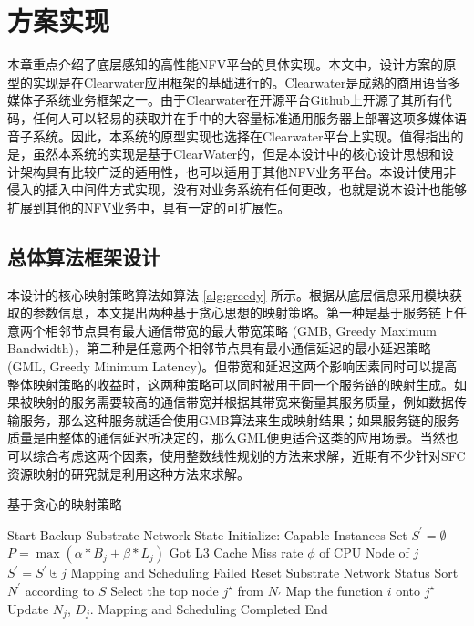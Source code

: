 \chapter{方案实现}
\label{chapter:implement}
本章重点介绍了底层感知的高性能NFV平台的具体实现。本文中，设计方案的原型的实现是在Clearwater应用框架的基础进行的。Clearwater是成熟的商用语音多媒体子系统业务框架之一。由于Clearwater在开源平台Github上开源了其所有代码，任何人可以轻易的获取并在手中的大容量标准通用服务器上部署这项多媒体语音子系统。因此，本系统的原型实现也选择在Clearwater平台上实现。值得指出的是，虽然本系统的实现是基于ClearWater的，但是本设计中的核心设计思想和设计架构具有比较广泛的适用性，也可以适用于其他NFV业务平台。本设计使用非侵入的插入中间件方式实现，没有对业务系统有任何更改，也就是说本设计也能够扩展到其他的NFV业务中，具有一定的可扩展性。
\section{总体算法框架设计}
本设计的核心映射策略算法如算法 \ref{alg:greedy} 所示。根据从底层信息采用模块获取的参数信息，本文提出两种基于贪心思想的映射策略。第一种是基于服务链上任意两个相邻节点具有最大通信带宽的最大带宽策略 (GMB, Greedy Maximum Bandwidth)，第二种是任意两个相邻节点具有最小通信延迟的最小延迟策略 (GML, Greedy Minimum Latency)。但带宽和延迟这两个影响因素同时可以提高整体映射策略的收益时，这两种策略可以同时被用于同一个服务链的映射生成。如果被映射的服务需要较高的通信带宽并根据其带宽来衡量其服务质量，例如数据传输服务，那么这种服务就适合使用GMB算法来生成映射结果；如果服务链的服务质量是由整体的通信延迟所决定的，那么GML便更适合这类的应用场景。当然也可以综合考虑这两个因素，使用整数线性规划的方法来求解，近期有不少针对SFC资源映射的研究就是利用这种方法来求解。
\begin{algorithm} 
	\caption{基于贪心的映射策略}  
	\label{alg:greedy}  
	\begin{algorithmic} [1]
		\State Start
		\State Backup Substrate Network State
		\State Initialize: Capable Instances Set $S^{\prime} = \emptyset$
		\State	$P = \max(\alpha*B_{j} + \beta*L_{j})$
		\State Got L3 Cache Miss rate $\phi$ of CPU Node of $j$
		\State $S^{\prime} = S^{\prime}\uplus j $
		\EndIf			
		\EndFor					
		\State Mapping and Scheduling Failed
		\State Reset Substrate Network Status
		\Return
		\EndIf
		\State Sort $N^{\prime}$ according to $S$	
		\State Select the top node $j^{\star}$ from $N_{\prime}$
		\State Map the function $i$ onto  $j^{\star}$
		\State Update $N_{j}$, $D_{j}$.
		\EndFor
		\State Mapping and Scheduling Completed
		\State End
	\end{algorithmic}  
\end{algorithm} 
